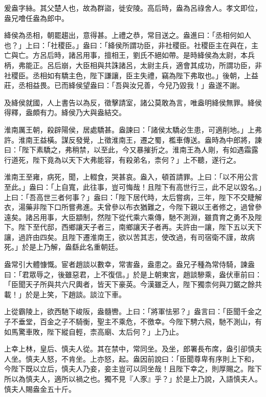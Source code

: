 
\begin{pinyinscope}
爰盎字絲。其父楚人也，故為群盜，徙安陵。高后時，盎為呂祿舍人。孝文即位，盎兄噲任盎為郎中。

絳侯為丞相，朝罷趨出，意得甚。上禮之恭，常目送之。盎進曰：「丞相何如人也？」上曰：「社稷臣。」盎曰：「絳侯所謂功臣，非社稷臣。社稷臣主在與在，主亡與亡。方呂后時，諸呂用事，擅相王，劉氏不絕如帶。是時絳侯為太尉，本兵柄，弗能正。呂后崩，大臣相與共誅諸呂，太尉主兵，適會其成功，所謂功臣，非社稷臣。丞相如有驕主色，陛下謙讓，臣主失禮，竊為陛下弗取也。」後朝，上益莊，丞相益畏。已而絳侯望盎曰：「吾與汝兄善，今兒乃毀我！」盎遂不謝。

及絳侯就國，人上書告以為反，徵擊請室，諸公莫敢為言，唯盎明絳侯無罪。絳侯得釋，盎頗有力。絳侯乃大與盎結交。

淮南厲王朝，殺辟陽侯，居處驕甚。盎諫曰：「諸侯太驕必生患，可適削地。」上弗許。淮南王益橫。謀反發覺，上徵淮南王，遷之蜀，檻車傳送。盎時為中郎將，諫曰：「陛下素驕之，弗稍禁，以至此，今又暴摧折之。淮南王為人剛，有如遇霜露行道死，陛下竟為以天下大弗能容，有殺弟名，柰何？」上不聽，遂行之。

淮南王至雍，病死，聞，上輟食，哭甚哀。盎入，頓首請罪。上曰：「以不用公言至此。」盎曰：「上自寬，此往事，豈可悔哉！且陛下有高世行三，此不足以毀名。」上曰：「吾高世三者何事？」盎曰：「陛下居代時，太后嘗病，三年，陛下不交睫解衣，湯藥非陛下口所嘗弗進。夫曾參以布衣猶難之，今陛下親以王者修之，過曾參遠矣。諸呂用事，大臣顓制，然陛下從代乘六乘傳，馳不測淵，雖賁育之勇不及陛下。陛下至代邸，西鄉讓天子者三，南鄉讓天子者再。夫許由一讓，陛下五以天下讓，過許由四矣。且陛下遷淮南王，欲以苦其志，使改過，有司宿衛不謹，故病死。」於是上乃解，盎繇此名重朝廷。

盎常引大體慷慨。宦者趙談以數幸，常害盎，盎患之。盎兄子種為常侍騎，諫盎曰：「君眾辱之，後雖惡君，上不復信。」於是上朝東宮，趙談驂乘，盎伏車前曰：「臣聞天子所與共六尺輿者，皆天下豪英。今漢雖乏人，陛下獨柰何與刀鋸之餘共載！」於是上笑，下趙談。談泣下車。

上從霸陵上，欲西馳下峻阪，盎髓轡。上曰：「將軍怯邪？」盎言曰：「臣聞千金之子不垂堂，百金之子不騎衡，聖主不乘危，不徼幸。今陛下騁六飛，馳不測山，有如馬驚車敗，陛下縱自輕，柰高廟、太后何？」上乃止。

上幸上林，皇后、慎夫人從。其在禁中，常同坐。及坐，郎署長布席，盎引卻慎夫人坐。慎夫人怒，不肯坐。上亦怒，起。盎因前說曰：「臣聞尊卑有序則上下和，今陛下既以立后，慎夫人乃妾，妾主豈可以同坐哉！且陛下幸之，則厚賜之。陛下所以為慎夫人，適所以禍之也。獨不見『人豕』乎？」於是上乃說，入語慎夫人。慎夫人賜盎金五十斤。


\end{pinyinscope}
